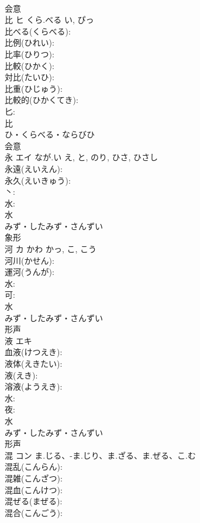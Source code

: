 \documentclass[8pt]{extreport}
\begin{document}
\begin{CJK}{UTF8}{min}
\\	会意 
\\	比	ヒ	くら.べる	い, ぴっ	
\\	比べる(くらべる): 
\\	比例(ひれい): 
\\	比率(ひりつ): 
\\	比較(ひかく): 
\\	対比(たいひ): 
\\	比重(ひじゅう): 
\\	比較的(ひかくてき): 
\\	匕: 
\\	比	
\\	ひ・くらべる・ならびひ	
\\	会意 
\\	永	エイ	なが.い	え, と, のり, ひさ, ひさし	
\\	永遠(えいえん): 
\\	永久(えいきゅう): 
\\	丶: 
\\	水: 
\\	水	
\\	みず・したみず・さんずい	
\\	象形 
\\	河	カ	かわ	かっ, こ, こう	
\\	河川(かせん): 
\\	運河(うんが): 
\\	水: 
\\	可: 
\\	水	
\\	みず・したみず・さんずい	
\\	形声 
\\	液	エキ			
\\	血液(けつえき): 
\\	液体(えきたい): 
\\	液(えき): 
\\	溶液(ようえき): 
\\	水: 
\\	夜: 
\\	水	
\\	みず・したみず・さんずい	
\\	形声 
\\	混	コン	ま.じる、-ま.じり、ま.ざる、ま.ぜる、こ.む		
\\	混乱(こんらん): 
\\	混雑(こんざつ): 
\\	混血(こんけつ): 
\\	混ぜる(まぜる): 
\\	混合(こんごう): 

\end{CJK}
\end{document}
